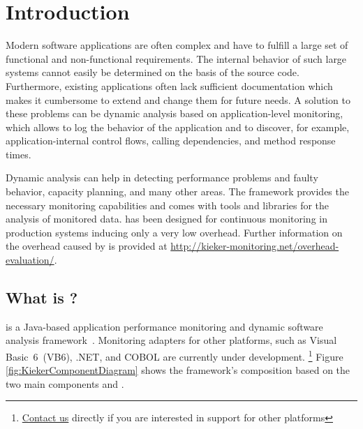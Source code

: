%


\chapter{Introduction}\label{chap:introduction}

Modern software applications are often complex and have to fulfill a large set of functional and non-functional requirements. The internal behavior of such large systems cannot easily be determined on the basis of the source code. Furthermore, existing applications often lack sufficient documentation which makes it cumbersome to extend and change them for future needs. A solution to these problems can be dynamic analysis based on application-level monitoring, which allows to log the behavior of the application and to discover, for example, application-internal control flows, calling dependencies, and method response times.

Dynamic analysis can help in detecting performance problems and faulty behavior, capacity planning, and many other areas. The \Kieker{} framework provides the necessary monitoring capabilities and comes with tools and libraries for the analysis of monitored data. \Kieker{} has been designed for %
continuous monitoring in production systems inducing only a very low overhead. Further information on the overhead caused by \Kieker{} is provided at \url{http://kieker-monitoring.net/overhead-evaluation/}.

\section{What is \Kieker?}\label{sec:kieker}

\enlargethispage{1cm}

\Kieker{} is a Java-based application performance monitoring and dynamic software analysis framework~\cite{KiekerICPE2012}. %
Monitoring adapters for other platforms, such as Visual Basic~6~(VB6), .NET, and COBOL are currently under development.%
\footnote{\href{http://kieker-monitoring.net/support/}{Contact us} directly if you are interested in \Kieker{} support for other platforms} %
Figure \ref{fig:KiekerComponentDiagram} shows the framework's composition based %
on the two main components \KiekerMonitoringPart{} and \KiekerAnalysisPart{}. %

